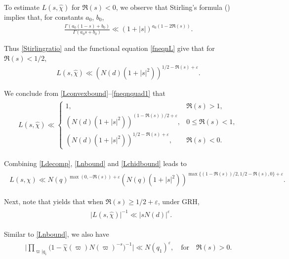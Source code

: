 \documentclass[twoside,leqno,10pt, A4]{amsart}
\begin{document}
  To estimate $L( s, \widehat \chi)$ for $\Re(s) < 0$, we observe that  Stirling's formula (\cite[(5.113)]{iwakow}) implies that, for
constants $a_0$, $b_0$,
\begin{align}
\label{Stirlingratio}
  \frac {\Gamma(a_0(1-s)+ b_0)}{\Gamma (a_0s+ b_0)} \ll (1+|s|)^{a_0(1-2\Re (s))}.
\end{align}

Thus \eqref{Stirlingratio} and the functional equation \eqref{fneqnL} give that for $\Re(s)<1/2$,
\begin{align}
\label{fneqnquad1}
  L(s, \widehat \chi) \ll (N(d)(1+|s|^2))^{1/2-\Re(s)+\varepsilon}.
\end{align}

We conclude from \eqref{Lconvexbound}--\eqref{fneqnquad1} that
\begin{align} \label{Lchidbound}
\begin{split}
   L(s, \widehat \chi) \ll \begin{cases}
   1,  & \Re(s) >1,\\
   (N(d)(1+|s|^2))^{(1-\Re(s))/2+\varepsilon},  & 0\leq \Re(s) <1,\\
    (N(d)(1+|s|^2))^{1/2-\Re(s)+\varepsilon}, & \Re(s) < 0.
\end{cases}
\end{split}
\end{align}

  Combining \eqref{Ldecomp}, \eqref{Lnbound} and \eqref{Lchidbound} leads to
\begin{align}
\label{Lchidgeneralbound}
\begin{split}
   L(s, \chi) \ll N(q)^{\max (0,-\Re(s))+\varepsilon} (N(q)(1+|s|^2))^{\max \{(1-\Re(s))/2, 1/2-\Re(s), 0\}+\varepsilon}.
\end{split}
\end{align}

Next, note that \cite[Theorem 5.19]{iwakow} yields that when $\Re(s) \geq 1/2+\varepsilon$, under GRH,
\begin{align} \label{PgLest1}
\begin{split}
& \big| L( s,  \widehat\chi )\big |^{-1} \ll |sN(d)|^{\varepsilon}.
\end{split}
\end{align}

  Similar to \eqref{Lnbound}, we also have
\begin{align}
\label{Lninvbound}
\begin{split}
 \Big | \prod_{\varpi | q_1}\Big(1-\widehat{\chi}(\varpi)N(\varpi)^{-s} \Big )^{-1} \Big | \ll
N(q_1)^{\varepsilon}, \quad \mbox{for} \quad \Re(s)>0.
\end{split}
\end{align}
\end{document}
